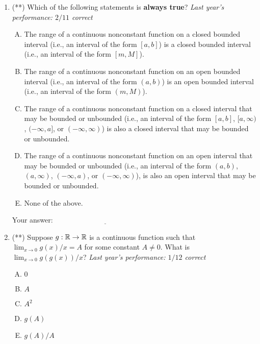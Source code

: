 \documentclass[10pt]{amsart}
\begin{document}
\begin{enumerate}

\item (**) Which of the following statements is {\bf always true}? {\em
  Last year's performance: $2/11$ correct}

  \begin{enumerate}[(A)]

  \item The range of a continuous nonconstant function on a closed
    bounded interval (i.e., an interval of the form $[a,b]$) is a
    closed bounded interval (i.e., an interval of the form $[m,M]$).
  \item The range of a continuous nonconstant function on an open
    bounded interval (i.e., an interval of the form $(a,b)$) is an
    open bounded interval (i.e., an interval of the form $(m,M)$).
  \item The range of a continuous nonconstant function on a closed
    interval that may be bounded or unbounded (i.e., an interval of
    the form $[a,b]$, $[a,\infty)$, $(-\infty,a]$, or
    $(-\infty,\infty)$) is also a closed interval that may be bounded
    or unbounded.
  \item The range of a continuous nonconstant function on an open
    interval that may be bounded or unbounded (i.e., an interval of
    the form $(a,b)$,$(a,\infty)$, $(-\infty,a)$, or
    $(-\infty,\infty)$), is also an open interval that may be bounded
    or unbounded.
  \item None of the above.
  \end{enumerate}

  \vspace{0.1in}
  Your answer: $\underline{\qquad\qquad\qquad\qquad\qquad\qquad\qquad}$
  \vspace{0.5in}

\item (**) Suppose $g:\mathbb{R} \to \mathbb{R}$ is a continuous function such that
  $\lim_{x \to 0} g(x)/x = A$ for some constant $A \ne 0$. What is
  $\lim_{x \to 0} g(g(x))/x$? {\em Last year's performance: $1/12$ correct}

  \begin{enumerate}[(A)]
  \item $0$
  \item $A$
  \item $A^2$
  \item $g(A)$
  \item $g(A)/A$
  \end{enumerate}


\end{enumerate}
\end{document}
